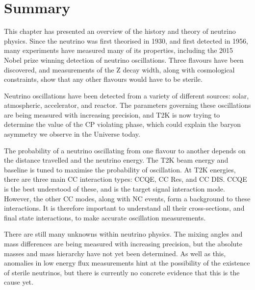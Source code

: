 \section{Summary}

This chapter has presented an overview of the history and theory of neutrino physics. Since the neutrino was first theorised in 1930, and first detected in 1956, many experiments have measured many of its properties, including the 2015 Nobel prize winning detection of neutrino oscillations. Three flavours have been discovered, and measurements of the Z decay width, along with cosmological constraints, show that any other flavours would have to be sterile.

Neutrino oscillations have been detected from a variety of different sources: solar, atmospheric, accelerator, and reactor. The parameters governing these oscillations are being measured with increasing precision, and T2K is now trying to determine the value of the CP violating phase, which could explain the baryon asymmetry we observe in the Universe today. 

The probability of a neutrino oscillating from one flavour to another depends on the distance travelled and the neutrino energy. The T2K beam energy and baseline is tuned to maximise the probability of oscillation. At T2K energies, there are three main CC interaction types: CCQE, CC Res, and CC DIS. CCQE is the best understood of these, and is the target signal interaction mode. However, the other CC modes, along with NC events, form a background to these interactions. It is therefore important to understand all their cross-sections, and final state interactions, to make accurate oscillation measurements.

There are still many unknowns within neutrino physics. The mixing angles and mass differences are being measured with increasing precision, but the absolute masses and mass hierarchy have not yet been determined. As well as this, anomalies in low energy flux measurements hint at the possibility of the existence of sterile neutrinos, but there is currently no concrete evidence that this is the cause yet. 

\newpage